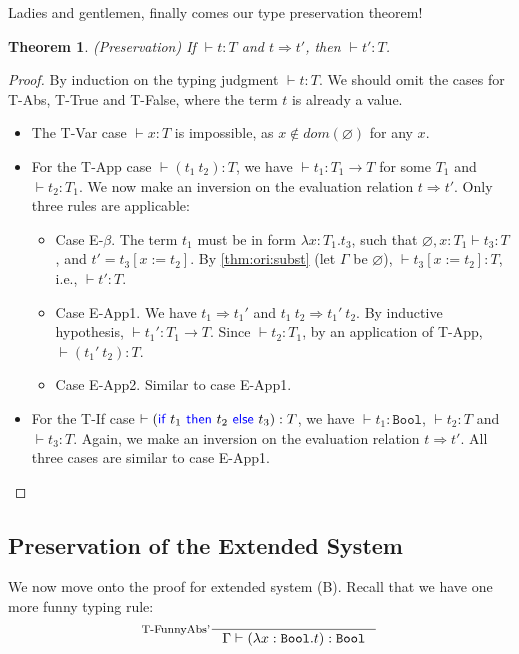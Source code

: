 \documentclass[11pt]{article}
\newtheorem{theorem}{Theorem}
\let\t\texttt
\let\emptyset\varnothing
\let\to\rightarrow
\let\reduce\Rightarrow
\newcommand{\Bool}{\t{Bool}}
\newcommand{\kword}[1]{{\color{blue} \textsf{#1}}}
\newcommand{\If}{\kword{if}}
\newcommand{\Then}{\kword{then}}
\newcommand{\Else}{\kword{else}}
\begin{document}
Ladies and gentlemen, finally comes our type preservation theorem!
\begin{theorem}\label{thm:ori:main}
    (Preservation) If $\vdash t:T$ and $t \reduce t'$, then $\vdash t':T$.
\end{theorem}
\begin{proof}
    By induction on the typing judgment $\vdash t:T$.
    We should omit the cases for T-Abs, T-True and T-False, where the term $t$ is already a value.
    \begin{itemize}
        \item The T-Var case $\vdash x:T$ is impossible, as $x \not\in dom(\emptyset)$ for any $x$.
        \item For the T-App case $\vdash (t_1~t_2):T$, we have $\vdash t_1:T_1 \to T$ for some $T_1$ and $\vdash t_2:T_1$.
        We now make an inversion on the evaluation relation $t \reduce t'$. Only three rules are applicable:
        \begin{itemize}
            \item Case E-$\beta$.
            The term $t_1$ must be in form $\lambda x:T_1.t_3$, such that $\emptyset,x:T_1 \vdash t_3:T$,
            and $t'=t_3[x:=t_2]$.
            By \cref{thm:ori:subst} (let $\Gamma$ be $\emptyset$), $\vdash t_3[x:=t_2]:T$, i.e., $\vdash t':T$.
            \item Case E-App1. We have $t_1 \reduce t_1'$ and $t_1~t_2 \reduce t_1'~t_2$.
            By inductive hypothesis, $\vdash t_1':T_1 \to T$.
            Since $\vdash t_2:T_1$, by an application of T-App, $\vdash (t_1'~t_2):T$.
            \item Case E-App2. Similar to case E-App1.
        \end{itemize}
        \item For the T-If case $\vdash (\If~t_1~\Then~t_2~\Else~t_3):T$, we have $\vdash t_1:\Bool$, $\vdash t_2:T$ and $\vdash t_3:T$.
        Again, we make an inversion on the evaluation relation $t \reduce t'$.
        All three cases are similar to case E-App1.
    \end{itemize}
\end{proof}

\subsection{Preservation of the Extended System}

We now move onto the proof for extended system (B). Recall that we have one more funny typing rule:
$$
    \inference[T-FunnyAbs']{}{\Gamma \vdash (\lambda x:\Bool.t) : \Bool}
$$
\end{document}
